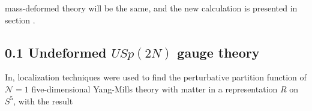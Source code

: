 \documentclass{article}
\begin{document}
mass-deformed theory will be the same, and the new calculation is presented in section .
\subsection*{0.1 Undeformed \(U S p(2 N)\) gauge theory}
In, localization techniques were used to find the perturbative partition function of \(\mathcal{N}=1\) five-dimensional Yang-Mills theory with matter in a representation \(R\) on \(S^{5}\), with the result
\end{document}
